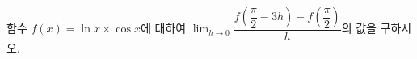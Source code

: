 함수 $f(x)=\ln x\times\cos x$에 대하여 $\displaystyle\lim_{h\to 0}\dfrac{f\left(\dfrac{\pi}{2}-3h\right)-f\left(\dfrac{\pi}{2}\right)}{h}$의 값을 구하시오.
